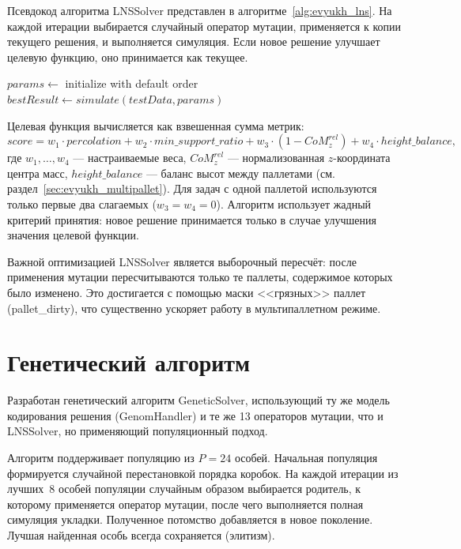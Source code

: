 Псевдокод алгоритма LNSSolver представлен в алгоритме~\ref{alg:evyukh_lns}. На каждой итерации выбирается случайный оператор мутации, применяется к копии текущего решения, и выполняется симуляция. Если новое решение улучшает целевую функцию, оно принимается как текущее.

\begin{algorithm}[H]
\caption{Large Neighborhood Search algorithm}
\label{alg:evyukh_lns}
$params \leftarrow$ initialize with default order\;
$bestResult \leftarrow simulate(testData, params)$\;
\end{algorithm}

Целевая функция вычисляется как взвешенная сумма метрик:
\[
score = w_1 \cdot percolation + w_2 \cdot min\_support\_ratio + w_3 \cdot (1 - CoM_z^{rel}) + w_4 \cdot height\_balance,
\]
где $w_1, \ldots, w_4$ --- настраиваемые веса, $CoM_z^{rel}$ --- нормализованная $z$-координата центра масс, $height\_balance$ --- баланс высот между паллетами (см. раздел~\ref{sec:evyukh_multipallet}). Для задач с одной паллетой используются только первые два слагаемых ($w_3 = w_4 = 0$). Алгоритм использует жадный критерий принятия: новое решение принимается только в случае улучшения значения целевой функции.

Важной оптимизацией LNSSolver является выборочный пересчёт: после применения мутации пересчитываются только те паллеты, содержимое которых было изменено. Это достигается с помощью маски <<грязных>> паллет (pallet\_dirty), что существенно ускоряет работу в мультипаллетном режиме.

\section{Генетический алгоритм}

Разработан генетический алгоритм GeneticSolver, использующий ту же модель кодирования решения (GenomHandler) и те же 13 операторов мутации, что и LNSSolver, но применяющий популяционный подход.

Алгоритм поддерживает популяцию из $P = 24$ особей. Начальная популяция формируется случайной перестановкой порядка коробок. На каждой итерации из лучших~8 особей популяции случайным образом выбирается родитель, к которому применяется оператор мутации, после чего выполняется полная симуляция укладки. Полученное потомство добавляется в новое поколение. Лучшая найденная особь всегда сохраняется (элитизм).

